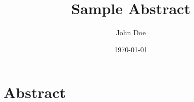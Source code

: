 \documentclass[a4paper]{article}
\title{Sample Abstract}
\author{John Doe}
\date{\today}
\begin{document}
    \maketitle
    \section*{Abstract}
    \lipsum[1]
    \bigskip
    \lipsum[2]
\end{document}
